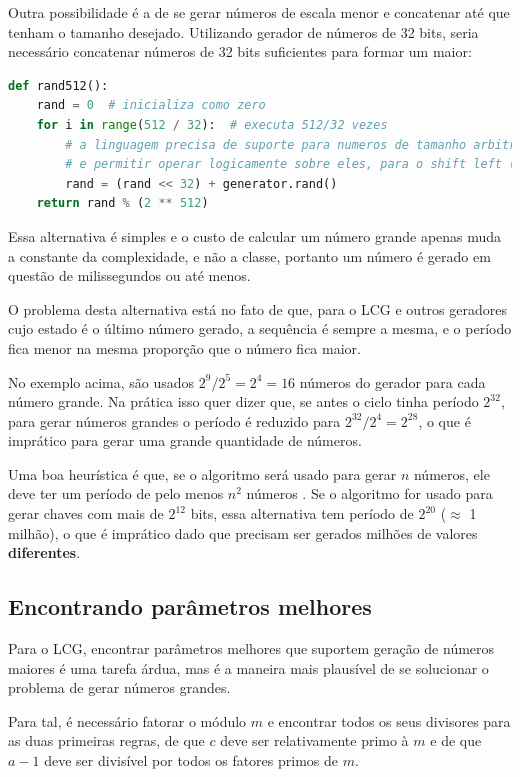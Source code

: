 \documentclass[12pt]{article}
\begin{document}
Outra possibilidade é a de se gerar números de escala menor e concatenar até
que tenham o tamanho desejado. Utilizando gerador de números de 32 bits, seria
necessário concatenar números de 32 bits suficientes para formar um maior:

\begin{lstlisting}[language=Python]
def rand512():
    rand = 0  # inicializa como zero
    for i in range(512 / 32):  # executa 512/32 vezes
        # a linguagem precisa de suporte para numeros de tamanho arbitrario
        # e permitir operar logicamente sobre eles, para o shift left (<<)
        rand = (rand << 32) + generator.rand()
    return rand % (2 ** 512)
\end{lstlisting}

Essa alternativa é simples e o custo de calcular um número grande apenas muda
a constante da complexidade, e não a classe, portanto um número é gerado em
questão de milissegundos ou até menos.

O problema desta alternativa está no fato de que, para o LCG e outros geradores
cujo estado é o último número gerado, a sequência é sempre a mesma, e o período
fica menor na mesma proporção que o número fica maior.

No exemplo acima, são usados $2^{9} / 2^{5} = 2^{4} = 16$ números do gerador
para cada número grande. Na prática isso quer dizer que, se antes o ciclo tinha
período $2^{32}$, para gerar números grandes o período é reduzido para
$2^{32} / 2^{4} = 2^{28}$, o que é imprático para gerar uma grande quantidade
de números.

Uma boa heurística é que, se o algoritmo será usado para gerar $n$ números, ele
deve ter um período de pelo menos $n^{2}$ números \cite{malone:15}.
Se o algoritmo for usado para gerar chaves com mais de $2^{12}$ bits, essa
alternativa tem período de $2^{20}$ ($\approx$ 1 milhão), o que é
imprático dado que precisam ser gerados milhões de valores \textbf{diferentes}.

\subsection{Encontrando parâmetros melhores}

Para o LCG, encontrar parâmetros melhores que suportem geração de números
maiores é uma tarefa árdua, mas é a maneira mais plausível de se solucionar o
problema de gerar números grandes.

Para tal, é necessário fatorar o módulo $m$ e encontrar todos os seus divisores
para as duas primeiras regras, de que $c$ deve ser relativamente primo à $m$ e
de que $a - 1$ deve ser divisível por todos os fatores primos de $m$.
\end{document}
